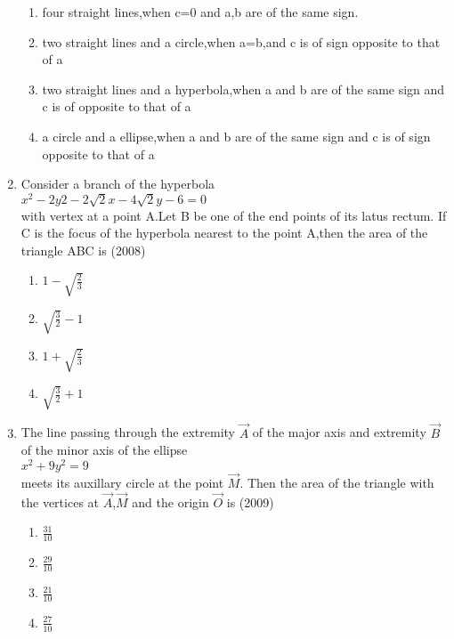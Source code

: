 \begin{enumerate}
\begin{enumerate}
    \item four straight lines,when c=0 and a,b are of the same sign.\\
    \item two straight lines and a circle,when a=b,and c is of sign opposite to that of a\\
    \item two straight lines and a hyperbola,when a and b are of the same sign and c is of opposite to that of a\\
    \item a circle and a ellipse,when a and b are of the same sign and c is of sign opposite to that of a\\
\end{enumerate}
\item Consider a branch of the hyperbola\\$x^{2}-2y{2}-2\sqrt{2}x-4\sqrt{2}y-6=0$\\with vertex at a point A.Let B be one of the end points of its latus rectum. If C is the focus of the hyperbola nearest to the point A,then the area of the triangle ABC is \hfill{(2008)}
\begin{multicols}{4}
\begin{enumerate}
    \item $1-\sqrt{\frac{2}{3}}$
    \item $\sqrt{\frac{3}{2}}-1$
    \item $1+\sqrt{\frac{2}{3}}$
    \item $\sqrt{\frac{3}{2}}+1$
\end{enumerate}
\end{multicols}
\item The line passing through the extremity $\vec{A}$ of the major axis and extremity $\vec{B}$ of the minor axis of the ellipse\\$x^{2}+9y^{2}=9$\\meets its auxillary circle at the point $\vec{M}$. Then the area of the triangle with the vertices at $\vec{A}$,$\vec{M}$ and the origin $\vec{O}$ is \hfill{(2009)}
\begin{multicols}{4}
\begin{enumerate}
    \item $\frac{31}{10}$
    \item $\frac{29}{10}$
    \item $\frac{21}{10}$
    \item $\frac{27}{10}$
\end{enumerate}
\end{multicols}
		

\end{enumerate}
